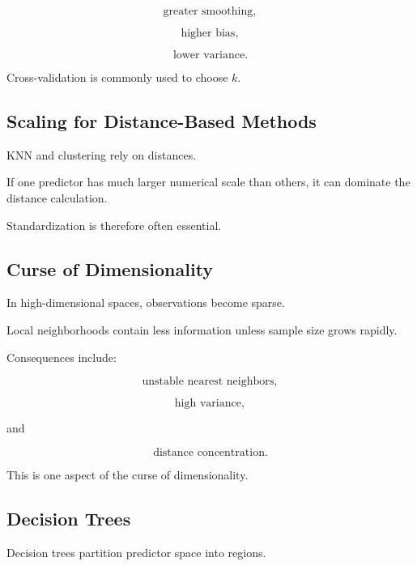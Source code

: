 \[
\boxed{
\text{greater smoothing},
}
\]

\[
\boxed{
\text{higher bias},
}
\]

\[
\boxed{
\text{lower variance}.
}
\]

Cross-validation is commonly used to choose \(k\).

\subsection{Scaling for Distance-Based Methods}
\label{subsec:scaling-distance-methods}

KNN and clustering rely on distances.

If one predictor has much larger numerical scale than others, it can
dominate the distance calculation.

Standardization is therefore often essential.

\subsection{Curse of Dimensionality}
\label{subsec:curse-dimensionality-learning}

In high-dimensional spaces, observations become sparse.

Local neighborhoods contain less information unless sample size grows
rapidly.

Consequences include:

\[
\boxed{
\text{unstable nearest neighbors},
}
\]

\[
\boxed{
\text{high variance},
}
\]

and

\[
\boxed{
\text{distance concentration}.
}
\]

This is one aspect of the curse of dimensionality.

\subsection{Decision Trees}
\label{subsec:decision-trees}

Decision trees partition predictor space into regions.

